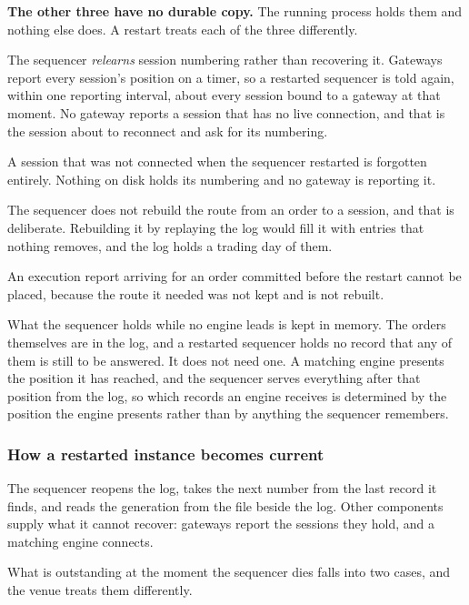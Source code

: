 \textbf{The other three have no durable copy.} The running process holds them
and nothing else does. A restart treats each of the three differently.

The sequencer \emph{relearns} session numbering rather than recovering it.
Gateways report every session's position on a timer, so a restarted sequencer is
told again, within one reporting interval, about every session bound to a gateway
at that moment. No gateway reports a session that has no live connection, and
that is the session about to reconnect and ask for its numbering.

\begin{gap}{}
  A session that was not connected when the sequencer restarted is forgotten
  entirely. Nothing on disk holds its numbering and no gateway is reporting it.
\end{gap}

The sequencer does not rebuild the route from an order to a session, and that is
deliberate. Rebuilding it by replaying the log would fill it with entries that
nothing removes, and the log holds a trading day of them.

\begin{gap}{}
  An execution report arriving for an order committed before the restart cannot
  be placed, because the route it needed was not kept and is not rebuilt.
\end{gap}

What the sequencer holds while no engine leads is kept in memory. The orders
themselves are in the log, and a restarted sequencer holds no record that any of
them is still to be answered. It does not need one. A matching engine presents the position it
has reached, and the sequencer serves everything after that position from the
log, so which records an engine receives is determined by the position the engine
presents rather than by anything the sequencer remembers.

\subsubsection{How a restarted instance becomes current}
\label{sec:ha:disabled:sequencer:recovery}

The sequencer reopens the log, takes the next number from the last record it
finds, and reads the generation from the file beside the log. Other components
supply what it cannot recover: gateways report the sessions they hold, and a
matching engine connects.

What is outstanding at the moment the sequencer dies falls into two cases, and
the venue treats them differently.


